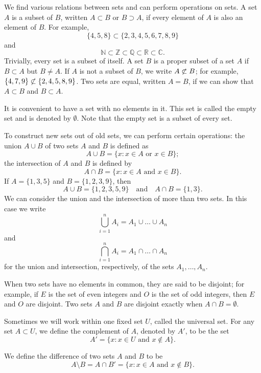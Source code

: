 We find various relations between sets and can perform operations on sets.  A set $A$ is a {\bfi subset\/} of $B$, written $A \subset B$\label{setcontain} or $B \supset A$, if every element of $A$ is also an element of $B$.  For example,  
\[
\{4,5,8\} \subset \{2, 3, 4, 5, 6, 7, 8, 9 \}
\]
and
\[
{\mathbb N} \subset {\mathbb Z} \subset {\mathbb Q} \subset {\mathbb R} \subset {\mathbb C}.
\]
Trivially, every set is a subset of itself.  A set $B$ is a {\bfi proper subset\/} of a set $A$ if $B \subset A$ but $B \neq A$. If $A$ is not a subset of $B$, we write $A \not\subset B$; for example, $\{4, 7, 9\} \not\subset \{2, 4, 5,  8, 9 \}$.  Two sets are {\bfi equal}, written $A = B$, if we can show that $A \subset B$ and $B \subset A$.  

It is convenient to have a set with no elements in it.  This set is called the {\bfi empty set\/} and is denoted by $\emptyset$\label{theemptyset}.  Note that the empty set is a subset of every set.  

To construct new sets out of old sets, we can perform certain operations: the {\bfi union\/} $A \cup B$ of two sets $A$ and $B$ is defined as  
\[
A \cup B\label{union} = \{x : x \in A \text{ or } x \in B \};
\]
the {\bfi intersection\/} of $A$ and $B$  is defined by
\[
A \cap B\label{intersection} = \{x :  x \in A \text{ and } x \in B \}.
\]
If $A = \{1, 3, 5\}$ and $B = \{ 1, 2, 3, 9 \}$, then
\[
A \cup B = \{1, 2, 3, 5, 9 \}
\quad \text{and} \quad
A \cap B = \{ 1, 3 \}.
\]
We can consider the union and the intersection of more than two sets.  In this case we write 
\[
\bigcup_{i = 1}^{n} A_{i} = A_{1} \cup \ldots \cup A_n
\]
and
\[
\bigcap_{i = 1}^{n} A_{i} = A_{1} \cap \ldots \cap A_n
\]
for the union and intersection, respectively, of the sets $A_1, \ldots, A_n$.  %

When two sets have no elements in common, they are said to be {\bfi disjoint}; for example, if $E$ is the set of even integers and $O$ is the set of odd integers, then $E$ and $O$ are disjoint.  Two sets $A$ and $B$ are disjoint exactly when $A \cap B = \emptyset$. 

Sometimes we will work within one fixed set $U$, called the {\bfi universal set}.  For any set $A \subset U$, we define the {\bfi complement\/} of $A$, denoted by $A'$\label{setcomplement}, to be the set 
\[
A' = \{ x : x \in U \text{ and } x \notin A \}.
\]

We define the {\bfi difference\/} of two sets $A$ and $B$ to be
\[
A \setminus B\label{setdifference} = A \cap B'  = \{ x : x \in A \text{ and } x \notin B \}.
\]


